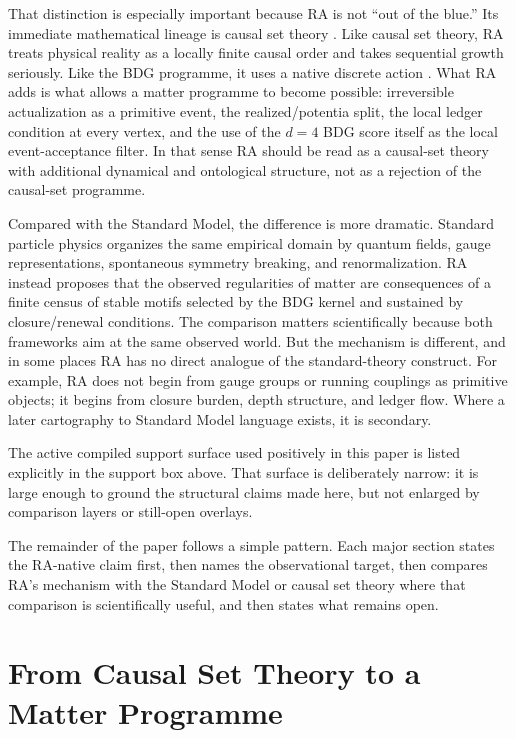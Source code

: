 \documentclass[11pt]{article}
\begin{document}
That distinction is especially important because RA is not ``out of the blue.'' Its immediate mathematical lineage is causal set theory \cite{Bombelli1987,Sorkin1997,Rideout2000}. Like causal set theory, RA treats physical reality as a locally finite causal order and takes sequential growth seriously. Like the BDG programme, it uses a native discrete action \cite{Benincasa2010,Dowker2013}. What RA adds is what allows a matter programme to become possible: irreversible actualization as a primitive event, the realized/potentia split, the local ledger condition at every vertex, and the use of the $d=4$ BDG score itself as the local event-acceptance filter. In that sense RA should be read as a causal-set theory with additional dynamical and ontological structure, not as a rejection of the causal-set programme.

Compared with the Standard Model, the difference is more dramatic. Standard particle physics organizes the same empirical domain by quantum fields, gauge representations, spontaneous symmetry breaking, and renormalization. RA instead proposes that the observed regularities of matter are consequences of a finite census of stable motifs selected by the BDG kernel and sustained by closure/renewal conditions. The comparison matters scientifically because both frameworks aim at the same observed world. But the mechanism is different, and in some places RA has no direct analogue of the standard-theory construct. For example, RA does not begin from gauge groups or running couplings as primitive objects; it begins from closure burden, depth structure, and ledger flow. Where a later cartography to Standard Model language exists, it is secondary.

The active compiled support surface used positively in this paper is listed explicitly in the support box above. That surface is deliberately narrow: it is large enough to ground the structural claims made here, but not enlarged by comparison layers or still-open overlays.

The remainder of the paper follows a simple pattern. Each major section states the RA-native claim first, then names the observational target, then compares RA's mechanism with the Standard Model or causal set theory where that comparison is scientifically useful, and then states what remains open.

\section{From Causal Set Theory to a Matter Programme}
\end{document}
